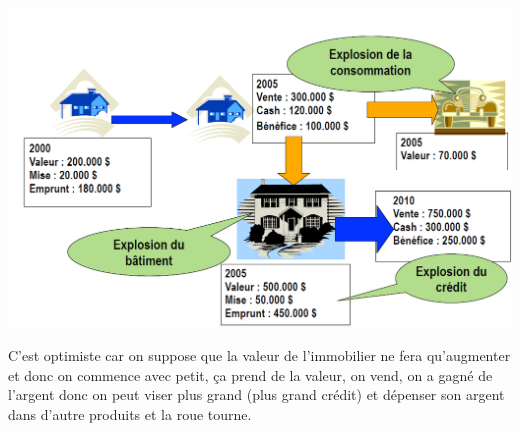 \begin{center}
\includegraphics[scale=0.4]{6}
\end{center} 

C'est optimiste car on suppose que la valeur de l'immobilier ne fera qu'augmenter et donc on commence avec petit, ça prend de la valeur, on vend, on a gagné de l'argent donc on peut viser plus grand (plus grand crédit) et dépenser son argent dans d'autre produits et la roue tourne.

